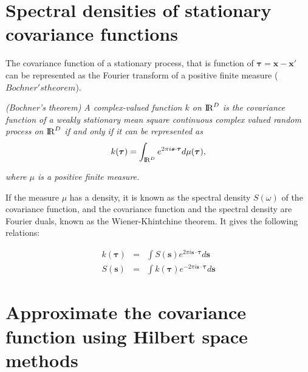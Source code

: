 \documentclass[]{interact}
\theoremstyle{plain}%
\theoremstyle{definition}
\theoremstyle{remark}
\begin{document}
 

\section{Spectral densities of stationary covariance functions}

The covariance function of a stationary process, that is function of $\bm{\tau}=\bm{x-x'}$ can be represented as the Fourier transform of a positive finite measure ($Bochner's theorem$). 

\vspace{0.2cm}
\textit{(Bochner’s theorem) A complex-valued function $k$ on ${\rm I\!R}^D$ is the covariance function of a weakly stationary mean square continuous complex valued random process on ${\rm I\!R}^D$ if and only if it can be represented as}
%
\begin{equation}
k(\bm{\tau})= \int_{{\rm I\!R}^D} e^{2\pi i \bm{s} \cdot \bm{\tau}} d\mu(\bm{\tau}), \nonumber 
\end{equation}

\textit{where $\mu$ is a positive finite measure.} 

\vspace{0.2cm}
If the measure $\mu$ has a density, it is known as the spectral density $S(\omega)$ of the covariance function, and the covariance function and the spectral density are Fourier duals, known as the Wiener-Khintchine theorem. It gives the following relations:

\begin{eqnarray}
k(\bm{\tau})&=& \int S(\bm{s}) e^{2\pi i \bm{s} \cdot \bm{\tau}} d\bm{s}  \nonumber \\
%
S(\bm{s})&=& \int k(\bm{\tau}) e^{-2\pi i \bm{s} \cdot \bm{\tau}} d\bm{s}  \nonumber
\end{eqnarray}

\section{Approximate the covariance function using Hilbert space methods}
\end{document}
